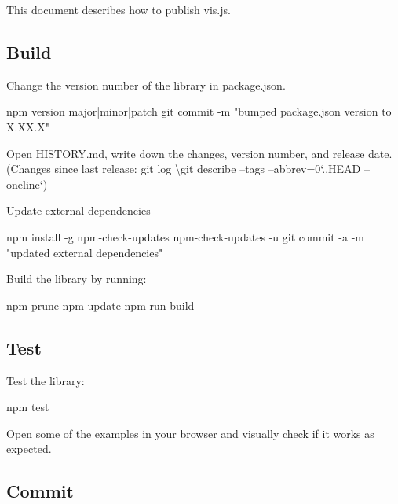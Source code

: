 This document describes how to publish vis.\+js.

\subsection*{Build}


\begin{DoxyItemize}
\item Change the version number of the library in {\ttfamily package.\+json}. \begin{DoxyVerb}  npm version major|minor|patch
  git commit -m "bumped package.json version to X.XX.X"
\end{DoxyVerb}

\item Open {\ttfamily H\+I\+S\+T\+O\+R\+Y.\+md}, write down the changes, version number, and release date. (Changes since last release\+: {\ttfamily git log \textbackslash{}}git describe --tags --abbrev=0`..H\+E\+AD --oneline`)
\item Update external dependencies \begin{DoxyVerb}  npm install -g npm-check-updates
  npm-check-updates -u
  git commit -a -m "updated external dependencies"
\end{DoxyVerb}

\item Build the library by running\+: \begin{DoxyVerb}  npm prune
  npm update
  npm run build
\end{DoxyVerb}

\end{DoxyItemize}

\subsection*{Test}


\begin{DoxyItemize}
\item Test the library\+: \begin{DoxyVerb}  npm test
\end{DoxyVerb}

\item Open some of the examples in your browser and visually check if it works as expected.
\end{DoxyItemize}

\subsection*{Commit}


